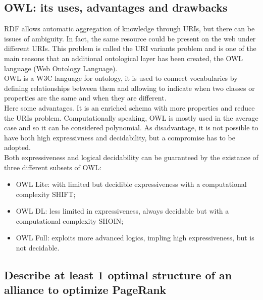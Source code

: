\subsection{OWL: its uses, advantages and drawbacks}
RDF allows automatic aggregation of knowledge through URIs,
but there can be issues of ambiguity. In fact, the same resource
could be present on the web under different URIs.
This problem is called the URI variants problem and is one of the main
reasons that an additional ontological layer has been created,
the OWL language (Web Ontology Language).\\
OWL is a W3C language for ontology, it is used to connect
vocabularies by defining relationships between them and allowing
to indicate when two classes or properties are the same and when they
are different.\\
Here some advantages. It is an enriched schema with more properties
and reduce the URIs problem. Computationally speaking, OWL is mostly
used in the average case and so it can be considered polynomial.
As disadvantage, it is not possible to have both high expressivness
and decidability, but a compromise has to be adopted.\\
Both expressiveness and logical decidability can be guaranteed
by the existance of three different subsets of OWL:
\begin{itemize}
    \item OWL Lite: with limited but decidible expressiveness with a
    computational complexity SHIFT;
    \item OWL DL: less limited in expressiveness, always decidable but
    with a computational complexity SHOIN;
    \item OWL Full: exploits more advanced logics, impling high
    expressiveness, but is not decidable.
\end{itemize}

\subsection{Describe at least 1 optimal structure of an
alliance to optimize PageRank}